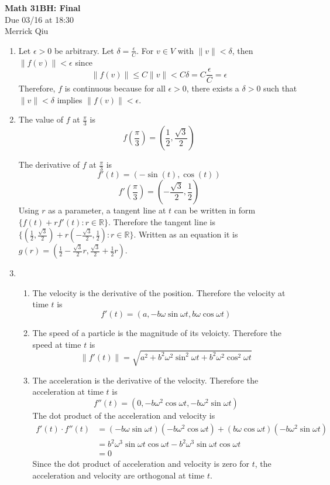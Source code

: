 \documentclass{report}
\begin{document}
\begin{center}
	\huge{\bf Math 31BH: Final} \\
	Due 03/16 at 18:30 \\
	Merrick Qiu
\end{center}

\bigskip

\begin{enumerate}
	\item 
	Let $\epsilon > 0$ be arbitrary.
	Let $\delta = \frac{\epsilon}{C}$.
	For $v \in V$ with $\|v\| < \delta$, 
	then $\|f(v)\| < \epsilon$ since
	\[
		\|f(v)\| \leq 
		C\|v\| <
		C \delta =
		C \frac{\epsilon}{C} =
		\epsilon
	\]
	Therefore, $f$ is continuous because for all $\epsilon > 0$,
	there exists a $\delta > 0$ such that 
	$\|v\| < \delta$ implies $\|f(v)\| < \epsilon$.

	\item 
	The value of $f$ at $\frac{\pi}{3}$ is
	\[
		f(\frac{\pi}{3}) = (\frac{1}{2}, \frac{\sqrt{3}}{2})
	\]
	
	The derivative of $f$ at $\frac{\pi}{3}$ is 
	\[
		f'(t) = (-\sin(t), \cos(t))
	\]
	\[
		f'(\frac{\pi}{3}) = (-\frac{\sqrt{3}}{2}, \frac{1}{2})
	\]
	Using $r$ as a parameter, a tangent line at $t$ can be written in form 
	$\{f(t) + rf'(t) : r \in \mathbb{R}\}$. 
	Therefore the tangent line is 
	$\{(\frac{1}{2}, \frac{\sqrt{3}}{2}) + r(-\frac{\sqrt{3}}{2}, \frac{1}{2}) : r \in \mathbb{R}\}$.
	Written as an equation it is
	$g(r) = (\frac{1}{2}-\frac{\sqrt{3}}{2}r, \frac{\sqrt{3}}{2} + \frac{1}{2}r)$.

	\item 
	\begin{enumerate}
		\item 
		The velocity is the derivative of the position.
		Therefore the velocity at time $t$ is 
		\[
			f'(t) = 
			(a, -b\omega\sin\omega t, b\omega\cos\omega t)
		\]

		\item 
		The speed of a particle is the magnitude of its veloicty.
		Therefore the speed at time $t$ is 
		\[
			\|f'(t)\| = 
			\sqrt{a^2 + b^2\omega^2\sin^2\omega t + b^2\omega^2\cos^2\omega t}
		\]

		\item 
		The acceleration is the derivative of the velocity.
		Therefore the acceleration at time $t$ is 
		\[
			f''(t) = 
			(0, -b\omega^2\cos\omega t, -b\omega^2\sin\omega t)
		\]
		The dot product of the acceleration and velocity is 
		\begin{align*}
			f'(t) \cdot f''(t)  
			&= (-b\omega\sin\omega t)(-b\omega^2\cos\omega t) + 
				(b\omega\cos\omega t)(-b\omega^2\sin\omega t) \\
			&= b^2\omega^3 \sin\omega t\cos\omega t - 
				b^2\omega^3 \sin\omega t\cos\omega t \\ 
			&= 0
		\end{align*}
		Since the dot product of acceleration and velocity is zero 
		for $t$, the acceleration and velocity are orthogonal at time $t$.
	\end{enumerate}


\end{enumerate}
\end{document}
